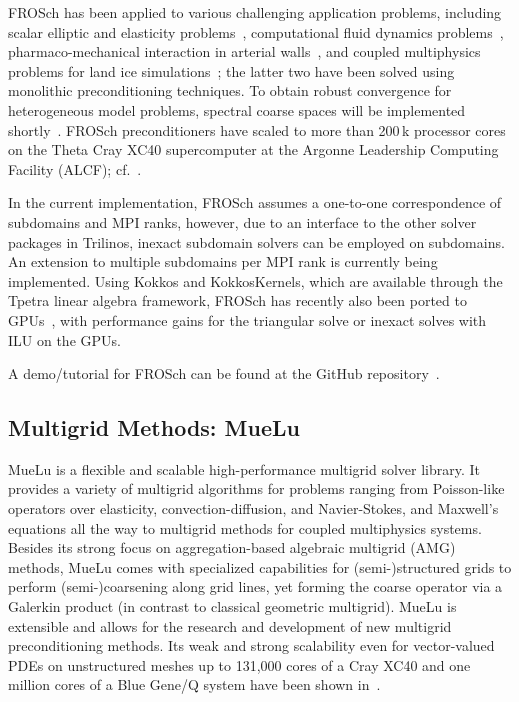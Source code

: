 FROSch has been applied to various challenging application problems, including scalar elliptic and elasticity problems~\cite{heinlein_parallel_2016}, computational fluid dynamics problems~\cite{heinlein_monolithic_2019}, pharmaco-mechanical interaction in arterial walls~\cite{balzani_computational_nodate}, and coupled multiphysics problems for land ice simulations~\cite{heinlein_frosch_2022}; the latter two have been solved using monolithic preconditioning techniques. To obtain robust convergence for heterogeneous model problems, spectral coarse spaces will be implemented shortly~\cite{heinlein_adaptive_2019}. FROSch preconditioners have scaled to more than 200\,k processor cores on the Theta Cray XC40 supercomputer at the Argonne Leadership Computing Facility (ALCF); cf.~\cite{heinlein_parallel_2022}.

In the current implementation, FROSch assumes a one-to-one correspondence of subdomains and MPI ranks, however, due to an interface to the other solver packages in Trilinos, inexact subdomain solvers can be employed on subdomains. An extension to multiple subdomains per MPI rank is currently being implemented. Using Kokkos and KokkosKernels, which are available through the Tpetra linear algebra framework, FROSch has recently also been ported to GPUs~\cite{Yamazaki:2022:EST}, with performance gains for the triangular solve or inexact solves with ILU on the GPUs.

A demo/tutorial for FROSch can be found at the GitHub repository~\cite{frosch_demo}.

\subsection{Multigrid Methods: MueLu}

MueLu is a flexible and scalable high-performance multigrid solver library.
It provides a variety of multigrid algorithms for problems ranging from Poisson-like operators over elasticity, convection-diffusion, and Navier-Stokes, and Maxwell’s equations
all the way to multigrid methods for coupled multiphysics systems.
Besides its strong focus on aggregation-based algebraic multigrid (AMG) methods,
MueLu comes with specialized capabilities for (semi-)structured grids to perform (semi-)coarsening along grid lines,
yet forming the coarse operator via a Galerkin product (in contrast to classical geometric multigrid).
MueLu is extensible and allows for the research and development of new multigrid preconditioning methods.
Its weak and strong scalability even for vector-valued PDEs on unstructured meshes
up to 131,000 cores of a Cray XC40 and one million cores of a Blue Gene/Q system have been shown in~\cite{Lin2017a,Thomas2019a}.

